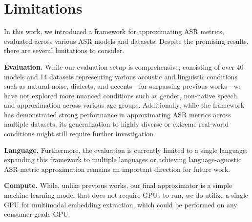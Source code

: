 \section{Limitations}\label{sec:limitations}
In this work, we introduced a framework for approximating ASR metrics, evaluated across various ASR models and datasets. Despite the promising results, there are several limitations to consider.

\noindent\textbf{Evaluation.} While our evaluation setup is comprehensive, consisting of over 40 models and 14 datasets representing various acoustic and linguistic conditions such as natural noise, dialects, and accents—far surpassing previous works—we have not explored more nuanced conditions such as gender, non-native speech, and approximation across various age groups. Additionally, while the framework has demonstrated strong performance in approximating ASR metrics across multiple datasets, its generalization to highly diverse or extreme real-world conditions might still require further investigation.

\noindent\textbf{Language.} Furthermore, the evaluation is currently limited to a single language; expanding this framework to multiple languages or achieving language-agnostic ASR metric approximation remains an important direction for future work.

\noindent\textbf{Compute.} While, unlike previous works, our final approximator is a simple machine learning model that does not require GPUs to run, we do utilize a single GPU for multimodal embedding extraction, which could be performed on any consumer-grade GPU.
